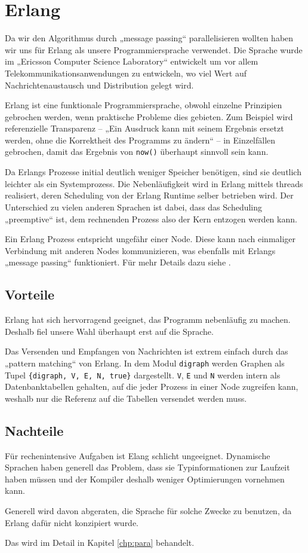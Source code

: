 \chapter{Erlang}
Da wir den Algorithmus durch „message passing“ parallelisieren wollten
haben wir uns für Erlang als unsere Programmiersprache verwendet.  Die
Sprache wurde im „Ericsson Computer Science Laboratory“ entwickelt um
vor allem Telekommunikationsanwendungen zu entwickeln, wo viel Wert
auf Nachrichtenaustausch und Distribution gelegt wird.

Erlang ist eine funktionale Programmiersprache, obwohl einzelne
Prinzipien gebrochen werden, wenn praktische Probleme dies gebieten.
Zum Beispiel wird referenzielle Transparenz – „Ein Ausdruck kann mit
seinem Ergebnis ersetzt werden, ohne die Korrektheit des Programms zu
ändern“ – in Einzelfällen gebrochen, damit das Ergebnis von
\lstinline!now()! überhaupt sinnvoll sein kann.

Da Erlangs Prozesse initial deutlich weniger Speicher benötigen, sind
sie deutlich leichter als ein Systemprozess.  Die Nebenläufigkeit wird
in Erlang mittels threads realisiert, deren Scheduling von der Erlang
Runtime selber betrieben wird.  Der Unterschied zu vielen anderen
Sprachen ist dabei, dass das Scheduling „preemptive“ ist, dem
rechnenden Prozess also der Kern entzogen werden kann.

Ein Erlang Prozess entspricht ungefähr einer Node.  Diese kann nach
einmaliger Verbindung mit anderen Nodes kommunizieren, was ebenfalls
mit Erlangs „message passing“ funktioniert.  Für mehr Details dazu
siehe \cite[Kapitel~„Distribunomicon“]{lyse}.

\section{Vorteile}
Erlang hat sich hervorragend geeignet, das Programm nebenläufig zu
machen.  Deshalb fiel unsere Wahl überhaupt erst auf die Sprache.

Das Versenden und Empfangen von Nachrichten ist extrem einfach durch
das „pattern matching“ von Erlang.  In dem Modul \lstinline!digraph!
werden Graphen als Tupel \lstinline!{digraph, V, E, N, true}!
dargestellt.  \lstinline!V!, \lstinline!E! und \lstinline!N! werden
intern als Datenbanktabellen gehalten, auf die jeder Prozess in einer
Node zugreifen kann, weshalb nur die Referenz auf die Tabellen
versendet werden muss.
\section{Nachteile}
Für rechenintensive Aufgaben ist Elang schlicht ungeeignet.
Dynamische Sprachen haben generell das Problem, dass sie
Typinformationen zur Laufzeit haben müssen und der Kompiler deshalb
weniger Optimierungen vornehmen kann.

Generell wird davon abgeraten, die Sprache für solche Zwecke zu
benutzen, da Erlang dafür nicht konzipiert wurde.
\cite[Kapitel~3]{lyse}

Das wird im Detail in Kapitel \ref{chp:para}
behandelt.
